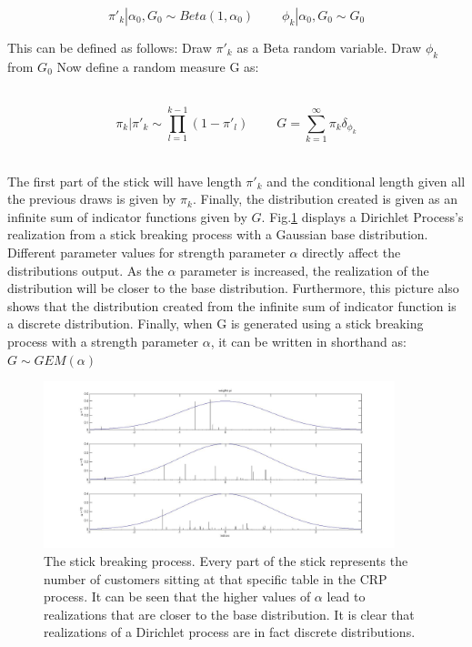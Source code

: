 \documentclass[twoside,hidelinks]{article}
\begin{document}
  \begin{equation}
\pi'_k  | \alpha_0, G_0 \sim Beta(1, \alpha_0)\ \ \ \ \ \ \ \ \ \   \phi_k | \alpha_0, G_0 \sim G_0
\end{equation}



This can be defined as follows: Draw $\pi'_k$ as a Beta random variable. Draw $\phi_k$ from $G_0$ Now define a random measure G as:


\ \
\begin{equation}
\pi_k  | \pi'_k \sim \prod_{l=1}^{k-1}(1- \pi'_l) \ \ \ \ \ \ \ \ \ \     G = \sum_{k=1}^\infty \pi_k \delta_{\phi_k} 
\end{equation}
\ \

The first part of the stick will have length $\pi'_k$ and the conditional length given all the previous draws is given by $\pi_k$. Finally, the distribution created is given as an infinite sum of indicator functions given by $G$. Fig.\ref{crpGausBase} displays a Dirichlet Process's realization from a stick breaking process with a Gaussian base distribution. Different parameter values for strength parameter $\alpha$ directly affect the distributions output. As the $\alpha$ parameter is increased, the realization of the distribution will be closer to the base distribution. Furthermore, this picture also shows that the distribution created from the infinite sum of indicator function is a discrete distribution. Finally, when G is generated using a stick breaking process with a strength parameter $\alpha$, it can be written in shorthand as: $ G \sim GEM(\alpha) $

\begin{figure}[h!]
          \centerline{\includegraphics[width=0.91\textwidth]{stickBreakGaus}}
	\caption{The stick breaking process. Every part of the stick represents the number of customers sitting at that specific table in the CRP process. It can be seen that the higher values of $\alpha$ lead to realizations that are closer to the base distribution. It is clear that realizations of a Dirichlet process are in fact discrete distributions.}
	\label{crpGausBase}
\end{figure}
\end{document}

